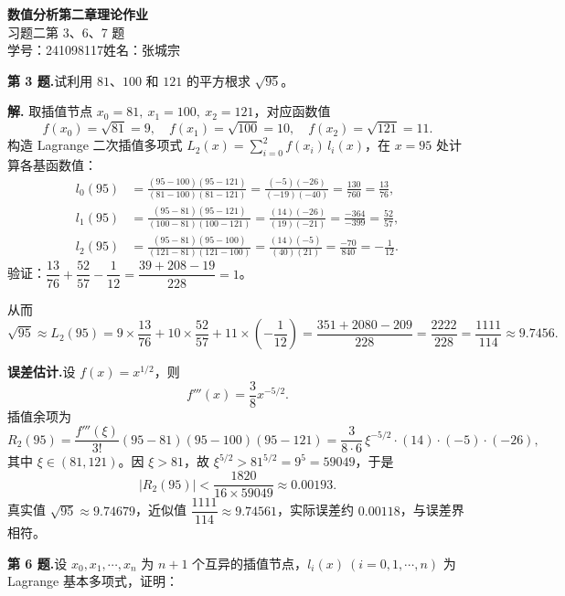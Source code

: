 \documentclass[UTF8,a4paper,11pt]{ctexart}
\begin{document}
\begin{center}
  {\LARGE\bfseries 数值分析\quad 第二章理论作业}\\[6pt]
  {\large 习题二\quad 第 3、6、7 题}\\[4pt]
  {\normalsize 学号：241098117\quad 姓名：张城宗}
\end{center}

\bigskip

\noindent\textbf{第 3 题.}\quad 试利用 $81$、$100$ 和 $121$ 的平方根求 $\sqrt{95}$。

\medskip
\noindent\textbf{解.}\quad
取插值节点 $x_0=81,\ x_1=100,\ x_2=121$，对应函数值
\[
  f(x_0)=\sqrt{81}=9,\quad f(x_1)=\sqrt{100}=10,\quad f(x_2)=\sqrt{121}=11.
\]
构造 Lagrange 二次插值多项式 $L_2(x)=\sum_{i=0}^{2}f(x_i)\,l_i(x)$，在 $x=95$ 处计算各基函数值：
\begin{align*}
  l_0(95) &= \frac{(95-100)(95-121)}{(81-100)(81-121)}
            = \frac{(-5)(-26)}{(-19)(-40)}
            = \frac{130}{760} = \frac{13}{76},\\[4pt]
  l_1(95) &= \frac{(95-81)(95-121)}{(100-81)(100-121)}
            = \frac{(14)(-26)}{(19)(-21)}
            = \frac{-364}{-399} = \frac{52}{57},\\[4pt]
  l_2(95) &= \frac{(95-81)(95-100)}{(121-81)(121-100)}
            = \frac{(14)(-5)}{(40)(21)}
            = \frac{-70}{840} = -\frac{1}{12}.
\end{align*}
验证：$\dfrac{13}{76}+\dfrac{52}{57}-\dfrac{1}{12} = \dfrac{39+208-19}{228} = 1$。\checkmark

从而
\[
  \sqrt{95} \approx L_2(95)
  = 9\times\frac{13}{76}+10\times\frac{52}{57}+11\times\left(-\frac{1}{12}\right)
  = \frac{351+2080-209}{228}
  = \frac{2222}{228}
  = \frac{1111}{114}
  \approx 9.7456.
\]

\noindent\textbf{误差估计.}\quad 设 $f(x)=x^{1/2}$，则
\[
  f'''(x) = \frac{3}{8}x^{-5/2}.
\]
插值余项为
\[
  R_2(95) = \frac{f'''(\xi)}{3!}(95-81)(95-100)(95-121)
           = \frac{3}{8\cdot 6}\,\xi^{-5/2}\cdot(14)\cdot(-5)\cdot(-26),
\]
其中 $\xi\in(81,121)$。因 $\xi>81$，故 $\xi^{5/2}>81^{5/2}=9^5=59049$，于是
\[
  |R_2(95)| < \frac{1820}{16\times 59049} \approx 0.00193.
\]
真实值 $\sqrt{95}\approx 9.74679$，近似值 $\dfrac{1111}{114}\approx 9.74561$，实际误差约 $0.00118$，与误差界相符。

\bigskip\bigskip

\noindent\textbf{第 6 题.}\quad 设 $x_0,x_1,\cdots,x_n$ 为 $n+1$ 个互异的插值节点，$l_i(x)\ (i=0,1,\cdots,n)$ 为 Lagrange 基本多项式，证明：
\end{document}
